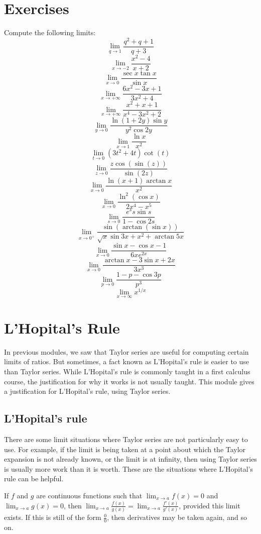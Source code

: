 \documentclass[a4paper]{book}
\begin{document}
\begin{sloppypar}
\section{Exercises}
Compute the following limits:
\[ \displaystyle \lim_{q \to 1} \frac{q^2 + q + 1}{q+3} \]
\[ \displaystyle \lim_{x \to -2} \frac {x^2-4}{x+2} \]
\[ \displaystyle \lim_{x \to 0} \frac{\sec x\tan x}{\sin x} \]
\[ \displaystyle \lim_{x \to +\infty} \frac{6x^2 -3x+1}{3x^2+4} \]
\[ \displaystyle \lim_{x \rightarrow +\infty} \frac {x^2+x+1}{x^4-3x^2+2} \]
\[ \displaystyle \lim_{y \to 0} \frac{\ln(1+2y)\sin y}{y^2\cos 2y} \]
\[ \displaystyle \lim_{x\to 1} \frac{\ln x}{x^2} \]
\[ \displaystyle \lim_{t\to 0} (3t^2+4t)\cot(t) \]
\[ \displaystyle \lim_{z\to 0} \frac{z\cos(\sin(z))}{\sin(2z)} \]
\[ \displaystyle \lim_{x \to 0} \frac{\ln (x+1)\arctan x}{x^2} \]
\[ \displaystyle \lim_{x \to 0} \frac{\ln^2(\cos x)}{2x^4-x^5} \]
\[ \displaystyle \lim_{s \to 0} \frac{e^s s \sin s}{1 - \cos 2s} \]
\[ \displaystyle \lim_{x \to 0^+} \frac{\sin(\arctan(\sin x))}{\sqrt{x} \sin 3x +x^2+ \arctan 5x} \]
\[ \displaystyle \lim_{x \to 0} \frac{\sin x -\cos x -1}{6x e^{2x}} \]
\[ \displaystyle \lim_{x \to 0} \frac{\arctan x-3 \sin x +2x}{3x^3} \]
\[ \displaystyle \lim_{p \to 0} \frac{1-p- \cos 3p}{p^3} \]
\[ \displaystyle \lim_{x \to \infty} x^{1/x} \]

\section{L'Hopital's Rule} \label{ChFunctionsSecLHopitalsRule}
In previous modules, we saw that Taylor series are useful for computing certain limits of ratios. But sometimes, a fact known as L'Hopital's rule is easier to use than Taylor series. While L'Hopital's rule is commonly taught in a first calculus course, the justification for why it works is not usually taught. This module gives a justification for L'Hopital's rule, using Taylor series.

\subsection{L'Hopital's rule}
There are some limit situations where Taylor series are not particularly easy to use. For example, if the limit is being taken at a point about which the Taylor expansion is not already known, or the limit is at infinity, then using Taylor series is usually more work than it is worth. These are the situations where L'Hopital's rule can be helpful.
\begin{definitionbox}[title=\textbf{L'Hopital's Rule, $\frac{0}{0}$ case}]
If $f$ and $g$ are continuous functions such that $\displaystyle \lim_{x \rightarrow a} f(x) = 0$ and $\displaystyle\lim_{x \rightarrow a} g(x) = 0$, then $\displaystyle \lim_{x \rightarrow a} \frac{f(x)}{g(x)} = \lim_{x\rightarrow a} \frac{f'(x)}{g'(x)}$, provided this limit exists. If this is still of the form $\frac{0}{0}$, then derivatives may be taken again, and so on.
\end{definitionbox}


\end{sloppypar}
\end{document}
